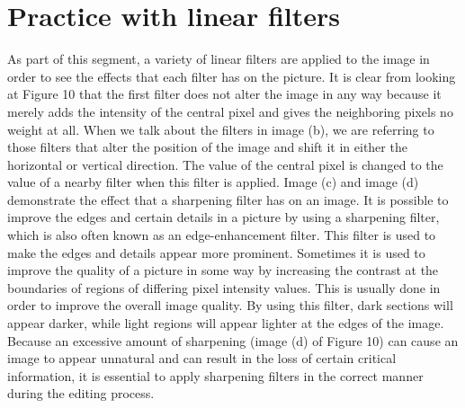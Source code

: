 \section{Practice with linear filters }\label{P3}

As part of this segment, a variety of linear filters are applied to the image in order to see the effects that each filter has on the picture. It is clear from looking at Figure 10 that the first filter does not alter the image in any way because it merely adds the intensity of the central pixel and gives the neighboring pixels no weight at all. When we talk about the filters in image (b), we are referring to those filters that alter the position of the image and shift it in either the horizontal or vertical direction. The value of the central pixel is changed to the value of a nearby filter when this filter is applied. Image (c) and image (d) demonstrate the effect that a sharpening filter has on an image. It is possible to improve the edges and certain details in a picture by using a sharpening filter, which is also often known as an edge-enhancement filter. This filter is used to make the edges and details appear more prominent. Sometimes it is used to improve the quality of a picture in some way by increasing the contrast at the boundaries of regions of differing pixel intensity values. This is usually done in order to improve the overall image quality. By using this filter, dark sections will appear darker, while light regions will appear lighter at the edges of the image. Because an excessive amount of sharpening (image (d) of Figure 10) can cause an image to appear unnatural and can result in the loss of certain critical information, it is essential to apply sharpening filters in the correct manner during the editing process.

